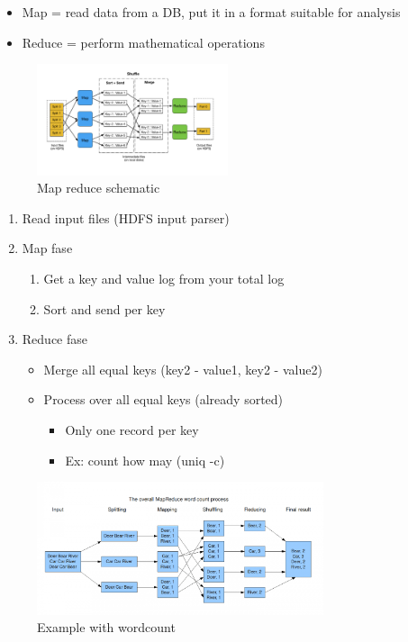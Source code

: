 \documentclass{article}
\begin{document}
\begin{itemize}
    \item Map = read data from a DB, put it in a format suitable for analysis
    \item Reduce = perform mathematical operations
\end{itemize}

\begin{figure}[H]
    \centering
    \includegraphics[width=0.5\textwidth]{map-reduce.jpg}
    \caption{Map reduce schematic}
\end{figure}

\begin{enumerate}
    \item Read input files (HDFS input parser)
    \item Map fase
    \begin{enumerate}
        \item Get a key and value log from your total log
        \item Sort and send per key
    \end{enumerate}
    \item Reduce fase
    \begin{itemize}
        \item Merge all equal keys (key2 - value1, key2 - value2)
        \item Process over all equal keys (already sorted)
        \begin{itemize}
            \item Only one record per key
            \item Ex: count how may (uniq -c)
        \end{itemize}
    \end{itemize}
\end{enumerate}

\begin{figure}[H]
    \centering
    \includegraphics[width=0.75\textwidth]{map-reduce-wordcount.png}
    \caption{Example with wordcount}
\end{figure}
\end{document}
